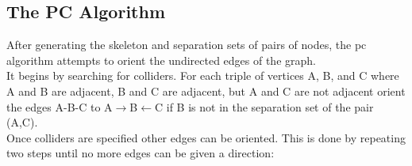 \documentclass{article}
\begin{document}
\subsection{The PC Algorithm}
After generating the skeleton and separation sets of pairs of nodes, the pc algorithm attempts to orient the undirected edges of the graph.
\\

It begins by searching for colliders. For each triple of vertices A, B, and C where A and B are adjacent, B and C are adjacent, but A and C are not adjacent orient the edges A-B-C to A$\rightarrow$B$\leftarrow$C if B is not in the separation set of the pair (A,C).
\\

Once colliders are specified other edges can be oriented. This is done by repeating two steps until no more edges can be given a direction:
\\
\end{document}
